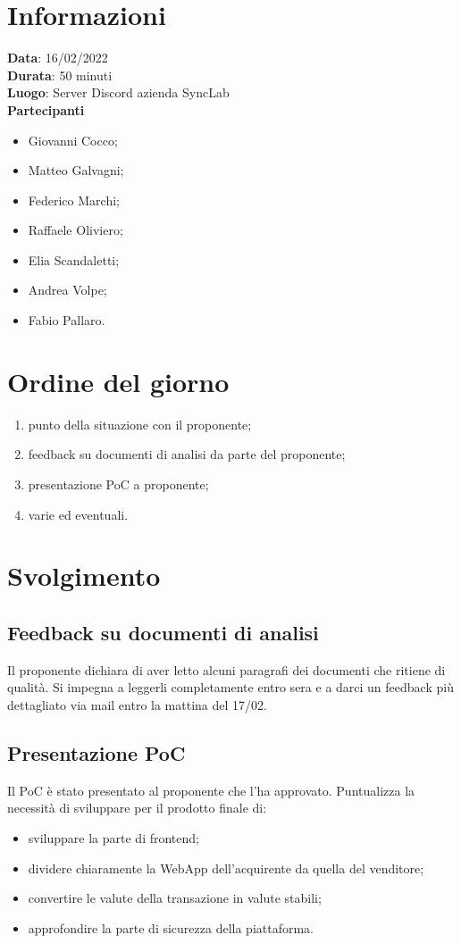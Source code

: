 \documentclass[a4paper, 12pt]{article}
\begin{document}
\makefrontpage

\section{Informazioni}
\textbf{Data}: 16/02/2022\\
\textbf{Durata}: 50 minuti\\
\textbf{Luogo}: Server Discord azienda SyncLab\\

\textbf{Partecipanti}
\begin{itemize}
	\item Giovanni Cocco;
	\item Matteo Galvagni;
	\item Federico Marchi;
	\item Raffaele Oliviero;
	\item Elia Scandaletti;
	\item Andrea Volpe;
	\item Fabio Pallaro.
\end{itemize}


\section{Ordine del giorno}
\begin{enumerate}
	\item punto della situazione con il proponente;
	\item feedback su documenti di analisi da parte del proponente;
	\item presentazione PoC a proponente;
	\item varie ed eventuali.
\end{enumerate}


\section{Svolgimento}
\subsection{Feedback su documenti di analisi}
Il proponente dichiara di aver letto alcuni paragrafi dei documenti che ritiene di qualità. Si impegna a leggerli completamente entro sera e a darci un feedback più dettagliato via mail entro la mattina del 17/02.

\subsection{Presentazione PoC}
Il PoC è stato presentato al proponente che l'ha approvato. Puntualizza la necessità di sviluppare per il prodotto finale di:
\begin{itemize}
	\item sviluppare la parte di frontend;
	\item dividere chiaramente la WebApp dell'acquirente da quella del venditore;
	\item convertire le valute della transazione in valute stabili;
	\item approfondire la parte di sicurezza della piattaforma.
\end{itemize}
\end{document}
